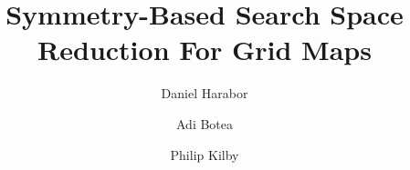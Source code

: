 \documentclass{article}
\begin{document}
\title{Symmetry-Based Search Space Reduction For Grid Maps}
\author{Daniel Harabor}
\author{Adi Botea}
\author{Philip Kilby}

\maketitle











%



\end{document}
